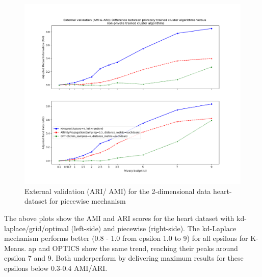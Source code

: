 \begin{figure}[H]
\begin{minipage}[c]{0.49\textwidth}
        \includegraphics[width=1\textwidth]{Results/2d-piecewise/heart-dataset/ami-and-ari.png}
        \caption{External validation (ARI/ AMI) for the 2-dimensional data heart-dataset for piecewise mechanism}
        \label{fig:external-validation-heart-dataset_comparison_2d-piecewise}
    \end{minipage}
\end{figure}
The above plots show the AMI and ARI scores for the heart dataset with kd-laplace/grid/optimal (left-side) and piecewise (right-side).
The kd-Laplace mechanism performs better (0.8 - 1.0 from epsilon 1.0 to 9) for all epsilons for K-Means.
\gls{ap} and OPTICS show the same trend, reaching their peaks around epsilon 7 and 9.
Both underperform by delivering maximum results for these epsilons below 0.3-0.4 AMI/ARI.\newline

